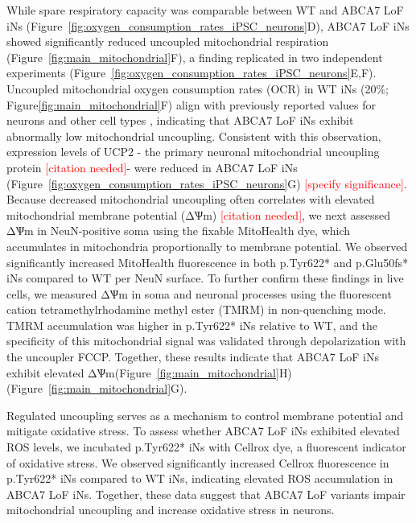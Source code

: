 While spare respiratory capacity was comparable between WT and ABCA7 LoF iNs (Figure~\ref{fig:oxygen_consumption_rates_iPSC_neurons}D), ABCA7 LoF iNs showed significantly reduced uncoupled mitochondrial respiration (Figure~\ref{fig:main_mitochondrial}F), a finding replicated in two independent experiments (Figure~\ref{fig:oxygen_consumption_rates_iPSC_neurons}E,F). Uncoupled mitochondrial oxygen consumption rates (OCR) in WT iNs (20\%; Figure\ref{fig:main_mitochondrial}F) align with previously reported values for neurons and other cell types \cite{Divakaruni2011-uj,Jekabsons2004-fn}, indicating that ABCA7 LoF iNs exhibit abnormally low mitochondrial uncoupling. Consistent with this observation, expression levels of UCP2 - the primary neuronal mitochondrial uncoupling protein \textcolor{red}{[citation needed]}- were reduced in ABCA7 LoF iNs (Figure~\ref{fig:oxygen_consumption_rates_iPSC_neurons}G) \textcolor{red}{[specify significance]}. Because decreased mitochondrial uncoupling often correlates with elevated mitochondrial membrane potential (ΔѰm) \textcolor{red}{[citation needed]}, we next assessed ΔѰm in NeuN-positive soma using the fixable MitoHealth dye, which accumulates in mitochondria proportionally to membrane potential. We observed significantly increased MitoHealth fluorescence in both p.Tyr622* and p.Glu50fs* iNs compared to WT per NeuN surface. To further confirm these findings in live cells, we measured ΔѰm in soma and neuronal processes using the fluorescent cation tetramethylrhodamine methyl ester (TMRM) in non-quenching mode. TMRM accumulation was higher in p.Tyr622* iNs relative to WT, and the specificity of this mitochondrial signal was validated through depolarization with the uncoupler FCCP. Together, these results indicate that ABCA7 LoF iNs exhibit elevated ΔѰm(Figure~\ref{fig:main_mitochondrial}H)(Figure~\ref{fig:main_mitochondrial}G). 

Regulated uncoupling serves as a mechanism to control membrane potential and mitigate oxidative stress. To assess whether ABCA7 LoF iNs exhibited elevated ROS levels, we incubated p.Tyr622* iNs with Cellrox dye, a fluorescent indicator of oxidative stress. We observed significantly increased Cellrox fluorescence in p.Tyr622* iNs compared to WT iNs, indicating elevated ROS accumulation in ABCA7 LoF iNs. Together, these data suggest that ABCA7 LoF variants impair mitochondrial uncoupling and increase oxidative stress in neurons.

